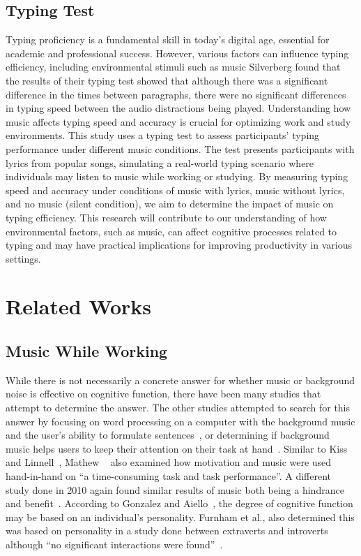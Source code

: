 \documentclass[manuscript, screen, review]{acmart} %
\begin{document}
\subsection{Typing Test}
Typing proficiency is a fundamental skill in today's digital age, essential for academic and professional success. 
However, various factors can influence typing efficiency, including environmental stimuli such as music Silverberg \cite{AudioDistractionsAshley} found that the results of their typing test showed that although there was a significant difference in the times between paragraphs, there were no significant differences in typing speed between the audio distractions being played. Understanding how music affects typing speed and accuracy is crucial for optimizing work and study environments.
This study uses a typing test to assess participants' typing performance under different music conditions. 
The test presents participants with lyrics from popular songs, simulating a real-world typing scenario where individuals may listen to music while working or studying.
By measuring typing speed and accuracy under conditions of music with lyrics, music without lyrics, and no music (silent condition), we aim to determine the impact of music on typing efficiency. 
This research will contribute to our understanding of how environmental factors, such as music, can affect cognitive processes related to typing and may have practical implications for improving productivity in various settings.

\section{Related Works}
\subsection{Music While Working}
While there is not necessarily a concrete answer for whether music or background noise is effective on cognitive function, there have been many
studies that attempt to determine the answer. 
The other studies attempted to search for this answer by focusing on word processing on a computer with the background music and the user's ability to formulate sentences~\cite{ransdell2001141}, or determining if background music helps users to keep their attention on their task at hand~\cite{kiss2021effect}. 
Similar to Kiss and Linnell~\cite{kiss2021effect}, Mathew ~\cite{mathew2022inherently} also examined how motivation and music were used hand-in-hand on ``a time-consuming task and task performance''. 
A different study done in 2010 again found similar results of music both being a hindrance and benefit~\cite{AudioDistractionsAshley}. 
According to Gonzalez and Aiello~\cite{Gonzalez_Aiello_2019}, the degree of cognitive function may be based on an individual's personality. 
Furnham et al., also determined this was based on personality in a study done between extraverts and introverts although ``no significant interactions were found''~\cite{distractingEffectsFurnham}.
\end{document}
